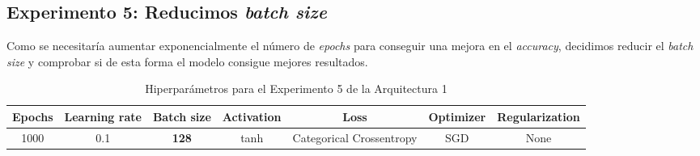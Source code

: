 \documentclass{article}
\begin{document}
		\subsection{Experimento 5: Reducimos \textit{batch size}}
		\label{s-a1-e5}
			Como se necesitar\'ia aumentar exponencialmente el n\'umero de \textit{epochs} para conseguir una mejora en el \textit{accuracy}, decidimos reducir el \textit{batch size} y comprobar si de esta forma el modelo consigue mejores resultados.
			\begin{table}[!h]
				\begin{center}
					\begin{tabular}{| c | c | c | c | c | c | c |}
						\textbf{Epochs} & \textbf{Learning rate} & \textbf{Batch size} & \textbf{Activation} & \textbf{Loss} & \textbf{Optimizer} & \textbf{Regularization} \\ \hline
						1000 & 0.1 & \textbf{128} & tanh & Categorical Crossentropy & SGD & None
					\end{tabular}
					\caption{Hiperpar\'ametros para el Experimento 5 de la Arquitectura 1}
					\label{tab:hip-a1-e5}
				\end{center}
			\end{table}
			
\end{document}

